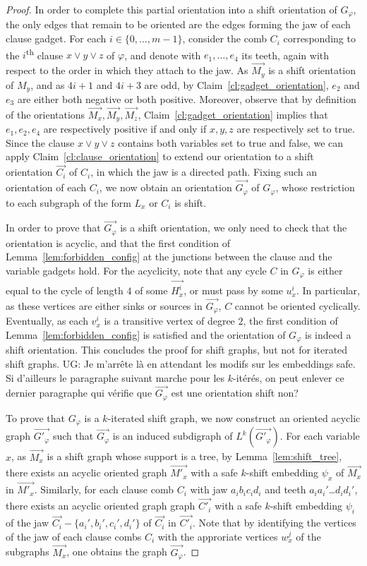 \documentclass[11pt,a4aper]{article}
\DeclareRobustCommand*{\ora}{\overrightarrow}
\renewcommand{\phi}{\varphi}
\newcommand*{\orCi}{\ora{C_i}}
\newcommand*{\orCip}{\ora{C'_i}}
\newcommand*{\orGphi}{\ora{G_{\phi}}}
\newcommand*{\orGphip}{\ora{G'_{\phi}}}
\newcommand*{\orHxi}{\ora{H_x^i}}
\newcommand*{\orMx}{\ora{M_x}}
\newcommand*{\orMxp}{\ora{M'_x}}
\newcommand*{\orMy}{\ora{M_y}}
\newcommand*{\orMz}{\ora{M_z}}
\newcommand{\ugo}[1]{{\color{red} UG: #1}}
\begin{document}
\begin{proof}
  In order to complete this partial orientation into a shift orientation of $G_{\phi}$, 
  the only edges that remain to be oriented are the edges forming the jaw of
  each clause gadget. For each $i\in \{0,\ldots,m-1\}$, consider the comb $C_i$ corresponding to the
  $i$\textsuperscript{th} clause $x\lor y\lor z$ of $\phi$, and denote with $e_1,\ldots, e_4$ its teeth, again with respect to the order in which they attach to the jaw. 
  As $\orMy$ is a shift orientation of $M_y$, and as $4i+1$ and $4i+3$ are odd,
  by
  Claim~\ref{cl:gadget_orientation}, $e_2$ and $e_3$ are either both negative or both
  positive. Moreover, observe that by definition of the orientations $\orMx, \orMy, \orMz$, Claim~\ref{cl:gadget_orientation} implies that $e_1,e_2,e_4$ are respectively positive if and only if $x,y,z$ are respectively set to true.
  Since the clause $x\lor y\lor z$ contains both variables set to true and false, we can apply
  Claim~\ref{cl:clause_orientation} to extend our orientation to a shift orientation $\orCi$ of $C_i$, in which the jaw is a directed path. Fixing such an orientation of each $C_i$, we now obtain an orientation $\orGphi$ of $G_{\phi}$, whose restriction to each subgraph of the form $L_x$ or $C_i$ is shift.
  
  In order to
  prove that $\orGphi$ is a shift orientation, we only need to check that the orientation is acyclic, and that the first
  condition of Lemma~\ref{lem:forbidden_config} at the junctions between the clause
  and the variable gadgets hold.
  For the acyclicity, note that any cycle $C$ in $G_{\phi}$ is either equal to the cycle of length $4$ of some $\orHxi$, or 
  must pass by some $u^{i}_x$. In particular, as these vertices are either sinks or sources in $\orGphi$, $C$ cannot be oriented cyclically. Eventually, as each $v^{i}_x$ is a transitive vertex of degree $2$, the first
  condition of Lemma~\ref{lem:forbidden_config} is satisfied and the orientation of
  $G_\phi$ is indeed a shift orientation. This concludes the proof for shift graphs, but not for iterated
  shift graphs.
  \ugo{Je m'arrête là en attendant les modifs sur les embeddings safe. Si d'ailleurs le paragraphe suivant marche pour les $k$-itérés, on peut enlever ce dernier paragraphe qui vérifie que $\orGphi$ est une orientation shift non?}
  
  
  To prove that $G_\phi$ is a $k$-iterated shift graph, we now construct an
  oriented acyclic graph $\orGphip$ such that $\orGphi$ is an induced subdigraph
  of $L^k(\orGphip)$. For each variable $x$, as $\orMx$ is a shift graph whose
  support is a tree, by Lemma~\ref{lem:shift_tree}, there exists an acyclic
  oriented graph $\orMxp$ with a safe $k$-shift embedding $\psi_x$ of $\orMx$
  in $\orMxp$. Similarly, for each clause comb $C_i$ with jaw $a_ib_ic_id_i$ and teeth
  $a_ia_i'$\dots $d_id_i'$, there exists an acyclic oriented graph graph $\orCip$ with a
  safe $k$-shift embedding $\psi_i$ of the jaw $\orCi -\{a_i',b_i',c_i',d_i'\}$ of $\orCi$
  in $\orCip$. Note that by identifying the vertices of the jaw of each clause combs $C_i$
  with the approriate vertices $w_x^j$ of the subgraphs
  $\orMx$, one obtains the graph $\orGphi$.



\end{proof}
\end{document}
